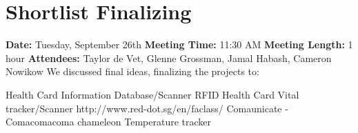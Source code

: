 \section{Shortlist Finalizing}
\textbf{Date:} Tuesday, September 26th
\newline
\textbf{Meeting Time:} 11:30 AM
\newline
\textbf{Meeting Length:} 1 hour
\newline
\textbf{Attendees:} Taylor de Vet, Glenne Grossman, Jamal Habash, Cameron Nowikow
\newline
\newline
We discussed final ideas, finalizing the projects to:

Health Card Information Database/Scanner
RFID Health Card
Vital tracker/Scanner http://www.red-dot.sg/en/faclass/
Comaunicate - Comacomacoma chameleon
Temperature tracker
